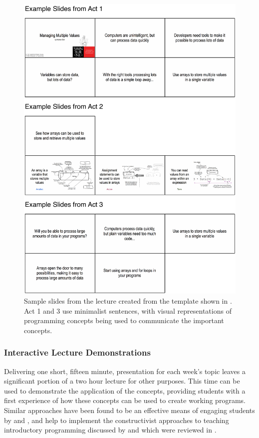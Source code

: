 \begin{figure}[htbp]
	\centering
	\includegraphics[width=\textwidth]{Lecture}
	\caption{Sample slides from the lecture created from the template shown in . Act 1 and 3 use minimalist sentences, with visual representations of programming concepts being used to communicate the important concepts.}
	\label{fig:lecture}
\end{figure}


\subsubsection{Interactive Lecture Demonstrations} %
\label{ssub:interactive_lecture_demonstrations}

Delivering one short, fifteen minute, presentation for each week's topic leaves a significant portion of a two hour lecture for other purposes. This time can be used to demonstrate the application of the concepts, providing students with a first experience of how these concepts can be used to create working programs. Similar approaches have been found to be an effective means of engaging students by \citet{Gaspar:2007} and \citet{Rubin:2013}, and help to implement the constructivist approaches to teaching introductory programming discussed by \citet{BenAri:1998,BenAri:2001} and \citet{VanGorp:2001} which were reviewed in .


